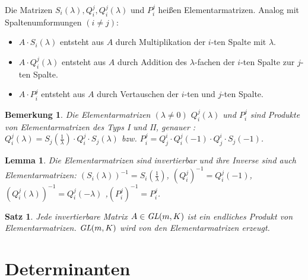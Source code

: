 \documentclass[12pt,a4paper]{article}
\theoremstyle{plain}
\newtheorem{Satz}[Theorem]{Satz}
\newtheorem{Lemma}[Theorem]{Lemma}
\newtheorem{Bemerkung}[Theorem]{Bemerkung}
\numberwithin{equation}{section}
\begin{document}
Die Matrizen $S_i(\lambda), Q^j_i, Q^j_i(\lambda)$ und $P^j_i$ heißen Elementarmatrizen. Analog mit Spaltenumformungen $(i\neq j)$: \begin{itemize}
\item $A\cdot S_i(\lambda)$ entsteht aus $A$ durch Multiplikation der $i$-ten Spalte mit $\lambda$.
\item $A\cdot Q^j_i(\lambda)$ entsteht aus $A$ durch Addition des $\lambda$-fachen der $i$-ten Spalte zur $j$-ten Spalte.
\item $A\cdot P^j_i$ entsteht aus $A$ durch Vertauschen der $i$-ten und $j$-ten Spalte.
\end{itemize}
\begin{Bemerkung}
Die Elementarmatrizen $(\lambda\neq 0)$ $Q^j_i(\lambda)$ und $P^j_i$ sind Produkte von Elementarmatrizen des Typs I und II, genauer : $Q^j_i(\lambda)=S_j(\frac{1}{\lambda})\cdot Q^j_i\cdot S_j(\lambda)$ bzw. $P^j_i=Q^i_j\cdot Q^j_i(-1)\cdot Q^i_j\cdot S_j(-1)$.
\end{Bemerkung}
\begin{Lemma}
Die Elementarmatrizen sind invertierbar und ihre Inverse sind auch Elementarmatrizen: $(S_i(\lambda))^{-1}=S_i(\frac{1}{\lambda})$, $(Q^j_i)^{-1}=Q^j_i(-1)$, $(Q_i^j(\lambda))^{-1}=Q^j_i(-\lambda)$ ,$(P^j_i)^{-1}=P^j_i$.
\end{Lemma}
\begin{Satz}
Jede invertierbare Matrix $A\in\emph{GL}(m,K)$ ist ein endliches Produkt von Elementarmatrizen. \glqq$\emph{GL}(m,K)$ wird von den Elementarmatrizen erzeugt.\grqq
\end{Satz}
\section{Determinanten}
\end{document}
